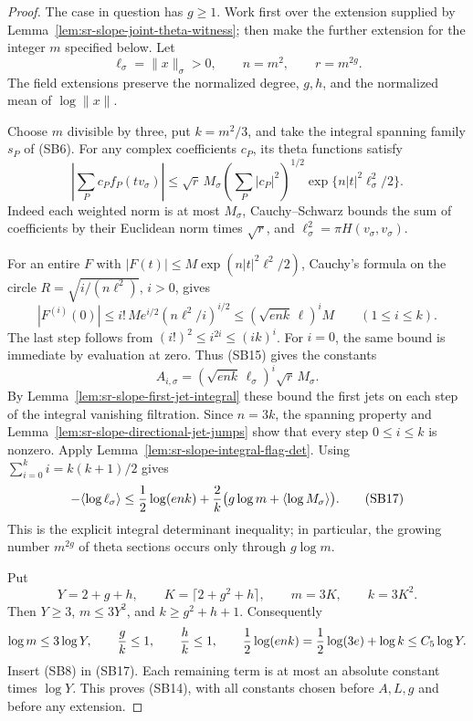 \begin{proof}
The case in question has \(g\ge1\).
Work first over the extension supplied by
Lemma~\ref{lem:sr-slope-joint-theta-witness};
then make the further extension for the
integer \(m\) specified below.
Let
\[
 \ell_\sigma=\|x\|_\sigma>0,\qquad n=m^2,\qquad r=m^{2g}.
\]
The field extensions preserve the normalized
degree, \(g,h\), and the normalized mean
of \(\log\|x\|\).

Choose \(m\) divisible by three, put
\(k=m^2/3\), and take the integral spanning
family \(s_P\) of (SB6).
For any complex coefficients \(c_P\), its
theta functions satisfy
\[
 \left|\sum_P c_P f_P(tv_\sigma)\right|
   \le \sqrt r\,M_\sigma
          \left(\sum_P|c_P|^2\right)^{1/2}
                    \exp\{n|t|^2\ell_\sigma^2/2\}.  \tag{SB15}
\]
Indeed each weighted norm is at most
\(M_\sigma\), Cauchy--Schwarz bounds the
sum of coefficients by their Euclidean
norm times \(\sqrt r\), and
\(\ell_\sigma^2=\pi H(v_\sigma,v_\sigma)\).

For an entire \(F\) with
\(|F(t)|\le M\exp(n|t|^2\ell^2/2)\),
Cauchy's formula on the circle
\(R=\sqrt{i/(n\ell^2)}\), \(i>0\), gives
\[
 |F^{(i)}(0)|\le i!\,M e^{i/2}
                                   (n\ell^2/i)^{i/2}
                    \le(\sqrt{enk}\,\ell)^iM
                         \qquad(1\le i\le k).
\]
The last step follows from
\((i!)^2\le i^{2i}\le(ik)^i\).
For \(i=0\), the same bound is immediate
by evaluation at zero.
Thus (SB15) gives the constants
\[
 A_{i,\sigma}
       =(\sqrt{enk}\,\ell_\sigma)^i
                                      \sqrt r\,M_\sigma. \tag{SB16}
\]
By Lemma~\ref{lem:sr-slope-first-jet-integral}
these bound the first jets on each step
of the integral vanishing filtration.
Since \(n=3k\), the spanning property and
Lemma~\ref{lem:sr-slope-directional-jet-jumps}
show that every step \(0\le i\le k\)
is nonzero.
Apply Lemma~\ref{lem:sr-slope-integral-flag-det}.
Using \(\sum_{i=0}^k i=k(k+1)/2\) gives
\[
 -\langle\log\ell_\sigma\rangle
     \le {1\over2}\log(enk)
           +{2\over k}\bigl(g\log m
                                 +\langle\log M_\sigma\rangle\bigr).
                                                               \tag{SB17}
\]
This is the explicit integral determinant
inequality; in particular, the growing
number \(m^{2g}\) of theta sections occurs
only through \(g\log m\).

Put
\[
 Y=2+g+h,\qquad
 K=\lceil2+g^2+h\rceil,\qquad m=3K,\qquad k=3K^2.
\]
Then \(Y\ge3\), \(m\le3Y^2\), and
\(k\ge g^2+h+1\).
Consequently
\[
 \log m\le3\log Y,\qquad
 {g\over k}\le1,\qquad {h\over k}\le1,\qquad
 {1\over2}\log(enk)
        ={1\over2}\log(3e)+\log k\le C_5\log Y.
\]
Insert (SB8) in (SB17).
Each remaining term is at most an absolute
constant times \(\log Y\).
This proves (SB14), with all constants
chosen before \(A,L,g\) and before any
extension.


\end{proof}

